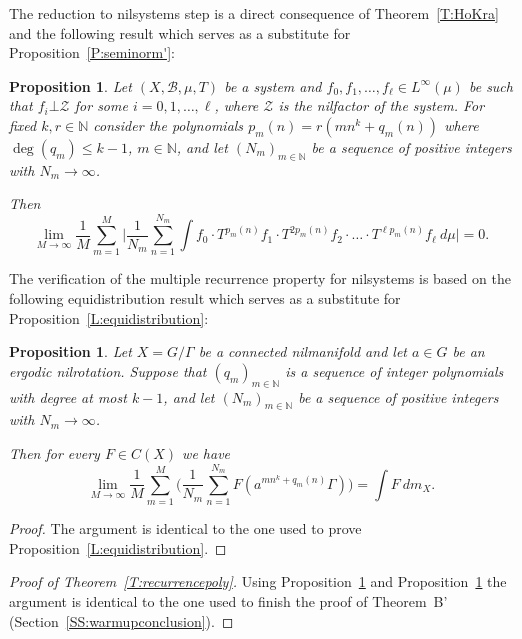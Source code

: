\documentclass[11pt]{amsart}
\newcommand{\N}{\mathbb{N}}
\theoremstyle{plain}
\newtheorem{proposition}[theorem]{Proposition}
\theoremstyle{definition}
\theoremstyle{remark}
\begin{document}
The reduction to nilsystems step is a direct consequence of Theorem~\ref{T:HoKra} and the
 following result
which serves as a substitute for
Proposition~\ref{P:seminorm'}:
\begin{proposition}\label{P:seminorm2}
  Let $(X,\mathcal{B},\mu,T)$ be a system and
  $f_0,f_1,\ldots,f_\ell\in L^\infty(\mu)$ be such that  $f_i \bot \mathcal{Z}$ for
  some $i=0,1,\ldots,\ell$, where $\mathcal{Z}$  is
  the nilfactor of the system. For fixed $k,r\in\N$ consider the polynomials
  $p_m(n)=r (mn^k+q_m(n))$ where $\deg(q_m)\leq k-1$, $m\in\N$, and let $(N_m)_{m\in\N}$
  be a sequence of positive integers with $N_m\to \infty$.

   Then
  \begin{equation}\label{E:AM}
 \lim_{M\to \infty} \frac{1}{M}\sum_{m=1}^M \Big|\frac{1}{N_m}\sum_{n=1}^{N_m} \int f_0\cdot  T^{p_m(n)} f_1
    \cdot T^{2p_m(n)}f_2\cdot\ldots\cdot T^{\ell p_m(n)}f_\ell\ d\mu \Big|=0.
  \end{equation}
\end{proposition}
The verification of the multiple recurrence property for nilsystems is
based on the following equidistribution result which serves as a substitute for
 Proposition~\ref{L:equidistribution}:
\begin{proposition}\label{P:equidistributiongeneral}
  Let $X=G/\Gamma$ be a connected  nilmanifold
  and let  $a\in G$ be an ergodic nilrotation. Suppose that
   $(q_m)_{m\in \N}$ is a sequence of integer polynomials with degree at
  most $k-1$, and  let $(N_m)_{m\in\N}$
  be a sequence of positive integers with $N_m\to \infty$.

  Then for every $F\in C(X)$ we have
$$
\lim_{M\to\infty} \frac{1}{M}\sum_{m=1}^M \Big(\frac{1}{N_m}\sum_{n=1}^{N_m}
F(a^{mn^k+q_m(n)}\Gamma)\Big)= \int F \ dm_X.
$$
\end{proposition}
\begin{proof}
  The argument is identical to the one used to prove
  Proposition~\ref{L:equidistribution}.
\end{proof}

\begin{proof}[Proof of Theorem~\ref{T:recurrencepoly}]
  Using Proposition~\ref{P:seminorm2} and
  Proposition~\ref{P:equidistributiongeneral} the argument is
  identical to the one used to finish the proof of Theorem~B'
  (Section~\ref{SS:warmupconclusion}).
\end{proof}
\end{document}
